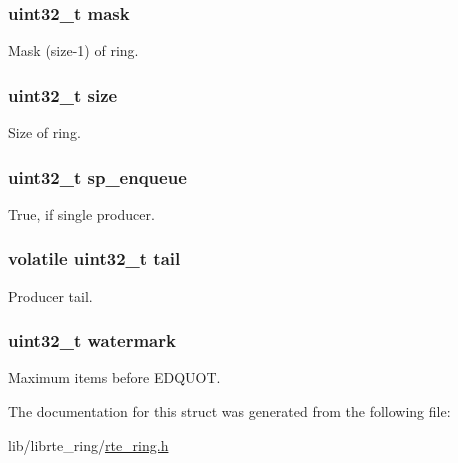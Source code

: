 \subsubsection[{mask}]{\setlength{\rightskip}{0pt plus 5cm}uint32\+\_\+t mask}\label{structrte__ring_1_1prod_ad3bee21df6875eeccd25d3c577e0600a}
Mask (size-\/1) of ring. \hypertarget{structrte__ring_1_1prod_ab2c6b258f02add8fdf4cfc7c371dd772}{}
\subsubsection[{size}]{\setlength{\rightskip}{0pt plus 5cm}uint32\+\_\+t size}\label{structrte__ring_1_1prod_ab2c6b258f02add8fdf4cfc7c371dd772}
Size of ring. \hypertarget{structrte__ring_1_1prod_a9215b840f399e8cab705caa55ed47222}{}
\subsubsection[{sp\+\_\+enqueue}]{\setlength{\rightskip}{0pt plus 5cm}uint32\+\_\+t sp\+\_\+enqueue}\label{structrte__ring_1_1prod_a9215b840f399e8cab705caa55ed47222}
True, if single producer. \hypertarget{structrte__ring_1_1prod_ac053cdb6967e8901ed4c87327d649bf7}{}
\subsubsection[{tail}]{\setlength{\rightskip}{0pt plus 5cm}volatile uint32\+\_\+t tail}\label{structrte__ring_1_1prod_ac053cdb6967e8901ed4c87327d649bf7}
Producer tail. \hypertarget{structrte__ring_1_1prod_aa45ec262d621c95d7c893c9862774cb7}{}
\subsubsection[{watermark}]{\setlength{\rightskip}{0pt plus 5cm}uint32\+\_\+t watermark}\label{structrte__ring_1_1prod_aa45ec262d621c95d7c893c9862774cb7}
Maximum items before E\+D\+Q\+U\+O\+T. 

The documentation for this struct was generated from the following file\+:\begin{DoxyCompactItemize}
\item 
lib/librte\+\_\+ring/\hyperlink{rte__ring_8h}{rte\+\_\+ring.\+h}\end{DoxyCompactItemize}

